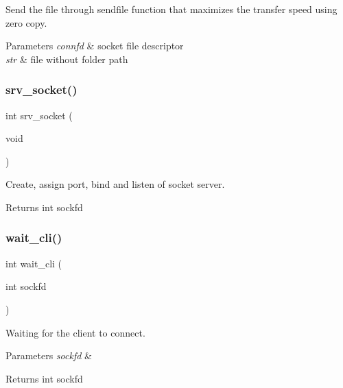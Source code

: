 Send the file through sendfile function that maximizes the transfer speed using zero copy. 


\begin{DoxyParams}{Parameters}
{\em connfd} & socket file descriptor \\
\hline
{\em str} & file without folder path \\
\hline
\end{DoxyParams}
\mbox{\label{socket_8c_abaa85d7aff16c338adf9a408c151bc28}} 
\subsubsection{srv\+\_\+socket()}
{\footnotesize\ttfamily int srv\+\_\+socket (\begin{DoxyParamCaption}\item[{void}]{ }\end{DoxyParamCaption})}



Create, assign port, bind and listen of socket server. 

\begin{DoxyReturn}{Returns}
int sockfd 
\end{DoxyReturn}
\mbox{\label{socket_8c_ad26b08974642b47dc5bf48289824f655}} 
\subsubsection{wait\+\_\+cli()}
{\footnotesize\ttfamily int wait\+\_\+cli (\begin{DoxyParamCaption}\item[{int}]{sockfd }\end{DoxyParamCaption})}



Waiting for the client to connect. 


\begin{DoxyParams}{Parameters}
{\em sockfd} & \\
\hline
\end{DoxyParams}
\begin{DoxyReturn}{Returns}
int sockfd 
\end{DoxyReturn}
